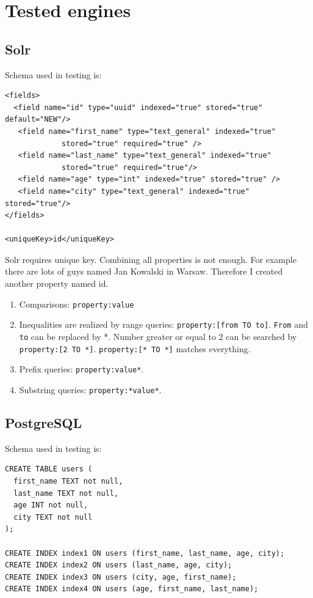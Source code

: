 \documentclass[10pt,a4paper]{article}
\begin{document}
\section{Tested engines}
\subsection{Solr}

Schema used in testing is:

\begin{verbatim}
<fields>
  <field name="id" type="uuid" indexed="true" stored="true" default="NEW"/>
   <field name="first_name" type="text_general" indexed="true"
             stored="true" required="true" /> 
   <field name="last_name" type="text_general" indexed="true" 
             stored="true" required="true"/>
   <field name="age" type="int" indexed="true" stored="true" /> 
   <field name="city" type="text_general" indexed="true" stored="true"/>
</fields>

<uniqueKey>id</uniqueKey> 
\end{verbatim}

Solr requires unique key. Combining all properties is not enough. For example there are lots of guys named Jan Kowalski in Warsaw. Therefore I created another property named id.

\begin{enumerate}
\item Comparisons: \verb|property:value|
\item Inequalities are realized by range queries: \verb|property:[from TO to]|. \verb|From| and \verb|to| can be replaced by *. Number greater or equal to 2 can be searched by \verb|property:[2 TO *]|. \verb|property:[* TO *]| matches everything.
\item Prefix queries: \verb|property:value*|.
\item Substring queries: \verb|property:*value*|.
 
\end{enumerate}

\subsection{PostgreSQL}

Schema used in testing is:

\begin{verbatim}
CREATE TABLE users (
  first_name TEXT not null,
  last_name TEXT not null,
  age INT not null,
  city TEXT not null
);

CREATE INDEX index1 ON users (first_name, last_name, age, city);
CREATE INDEX index2 ON users (last_name, age, city);
CREATE INDEX index3 ON users (city, age, first_name);
CREATE INDEX index4 ON users (age, first_name, last_name);
\end{verbatim}
\end{document}

